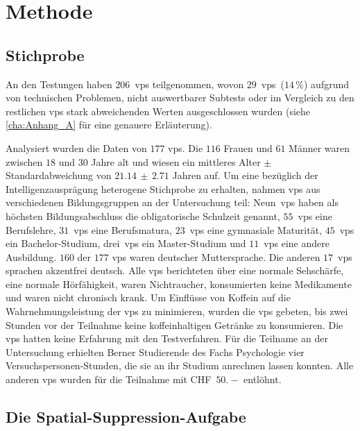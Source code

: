 \documentclass[11pt, twoside, a4paper]{book}		%
\begin{document}
\chapter{Methode \label{cha:Methode}}

\section{Stichprobe \label{sec:Stichprobe}}

An den Testungen haben $206$~\glspl{vp} teilgenommen, wovon $29$~\glspl{vp}~($14\,\%$) aufgrund von technischen Problemen, nicht auswertbarer Subtests oder im Vergleich zu den restlichen \glspl{vp} stark abweichenden Werten ausgeschlossen wurden (siehe \autoref{cha:Anhang_A} für eine genauere Erläuterung).

Analysiert wurden die Daten von $177$ \glspl{vp}. Die $116$ Frauen und $61$ Männer waren zwischen $18$ und $30$ Jahre alt und wiesen ein mittleres Alter $\pm$ Standardabweichung von $21.14\,\pm\,2.71$ Jahren auf. 
Um eine bezüglich der Intelligenzausprägung heterogene Stichprobe zu erhalten, nahmen \glspl{vp} aus verschiedenen Bildungsgruppen an der Untersuchung teil:
Neun~\glspl{vp} haben als höchsten Bildungsabschluss die obligatorische Schulzeit genannt,
$55$~\glspl{vp} eine Berufslehre,
$31$~\glspl{vp} eine Berufsmatura,
$23$~\glspl{vp} eine gymnasiale Maturität,
$45$~\glspl{vp} ein Bachelor-Studium,
drei~\glspl{vp} ein Master-Studium und 
$11$~\glspl{vp} eine andere Ausbildung.
$160$ der $177$ \glspl{vp} waren deutscher Muttersprache. Die anderen $17$~\glspl{vp} sprachen akzentfrei deutsch. Alle \glspl{vp} berichteten über eine normale Sehschärfe, eine normale Hörfähigkeit, waren Nichtraucher, konsumierten keine Medikamente und waren nicht chronisch krank. Um Einflüsse von Koffein auf die Wahrnehmungsleistung \citep[][]{Stough1995} der \glspl{vp} zu minimieren, wurden die \glspl{vp} gebeten, bis zwei Stunden vor der Teilnahme keine koffeinhaltigen Getränke zu konsumieren. Die \glspl{vp} hatten keine Erfahrung mit den Testverfahren. 
Für die Teilname an der Untersuchung erhielten Berner Studierende des Fachs Psychologie vier Ver\-suchs\-per\-sonen-Stun\-den, die sie an ihr Studium anrechnen lassen konnten. Alle anderen \glspl{vp} wurden für die Teilnahme mit CHF~$50.-$ entlöhnt.


\section{Die Spatial-Suppression-Aufgabe \label{sec:Die_Spatial-Suppression-Aufgabe}}
\end{document}
